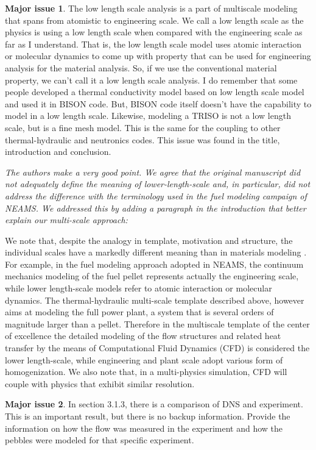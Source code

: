 \documentclass{nseJournal}
\begin{document}
\textbf{Major issue 1}.  The low length scale analysis is a part of multiscale modeling that spans from atomistic to engineering scale. We call a low length scale as the physics is using a low length scale when compared with the engineering scale as far as I understand. That is, the low length scale model uses atomic interaction or molecular dynamics to come up with property that can be used for engineering analysis for the material analysis. So, if we use the conventional material property, we can't call it a low length scale analysis. I do remember that some people developed a thermal conductivity model based on low length scale model and used it in BISON code. But, BISON code itself doesn't have the capability to model in a low length scale. Likewise, modeling a TRISO is not a low length scale, but is a fine mesh model. This is the same for the coupling to other thermal-hydraulic and neutronics codes. This issue was found in the title, introduction and conclusion.

\textit{The authors make a very good point. We agree that the original manuscript did not adequately define the meaning of lower-length-scale and, in particular, did not address the difference with the terminology used in the fuel modeling campaign of NEAMS. We addressed this by adding a paragraph in the introduction that better explain our multi-scale approach:}

We note that, despite the analogy in template, motivation and structure,  the individual scales have a markedly different meaning than in materials modeling \cite{tonks2013multiscale}. For example, in the fuel modeling approach adopted in NEAMS, the continuum mechanics modeling of the fuel pellet represents actually the engineering scale, while lower length-scale models refer to atomic interaction or molecular dynamics.
The thermal-hydraulic multi-scale template described above, however aims at modeling the full power plant, a system that is several orders of magnitude larger than a pellet.  Therefore in the multiscale template of the center of excellence the detailed modeling of the flow structures and related heat transfer  by the means of Computational Fluid Dynamics (CFD) is considered the lower length-scale, while engineering and plant scale adopt various form of homogenization. We also note that, in a multi-physics simulation, CFD will couple with physics that exhibit similar resolution.

\textbf{Major issue 2}.  In section 3.1.3, there is a comparison of DNS and experiment. This is an important result, but there is no backup information. Provide the information on how the flow was measured in the experiment and how the pebbles were modeled for that specific experiment.
\end{document}
